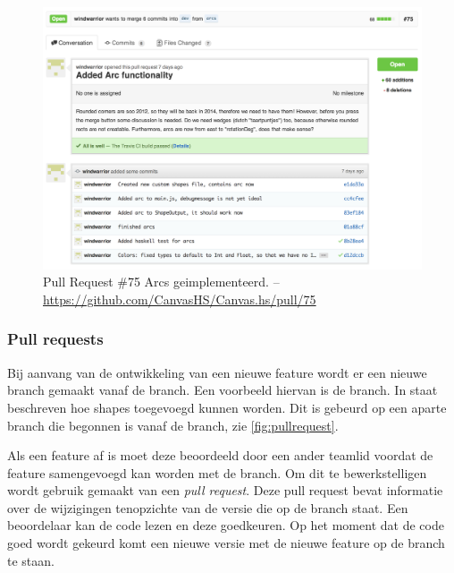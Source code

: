 \begin{figure}[H]
\begin{center}
\includegraphics[keepaspectratio,width=\textwidth]{./images/pullrequest.png}
\caption{Pull Request \#75 Arcs geimplementeerd. – \url{https://github.com/CanvasHS/Canvas.hs/pull/75}}
\label{fig:pullrequest}
\end{center}
\end{figure}

\subsubsection{Pull requests}
Bij aanvang van de ontwikkeling van een nieuwe feature wordt er een nieuwe branch gemaakt vanaf de  branch. Een voorbeeld hiervan is de  branch. In  staat beschreven hoe  shapes toegevoegd kunnen worden. Dit is gebeurd op een aparte branch die begonnen is vanaf de  branch, zie \autoref{fig:pullrequest}.

Als een feature af is moet deze beoordeeld door een ander teamlid voordat de feature samengevoegd kan worden met de  branch. Om dit te bewerkstelligen wordt gebruik gemaakt van een \emph{pull request}. Deze pull request bevat informatie over de wijzigingen tenopzichte van de versie die op de  branch staat. Een beoordelaar kan de code lezen en deze goedkeuren. Op het moment dat de code goed wordt gekeurd komt een nieuwe versie met de nieuwe feature op de  branch te staan.

